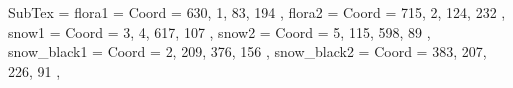 SubTex = {
	flora1								= { Coord = { 630, 1, 83, 194 } },
	flora2								= { Coord = { 715, 2, 124, 232 } },
	snow1								= { Coord = { 3, 4, 617, 107 } },
	snow2								= { Coord = { 5, 115, 598, 89 } },
	snow_black1								= { Coord = { 2, 209, 376, 156 } },
	snow_black2								= { Coord = { 383, 207, 226, 91 } },
}
